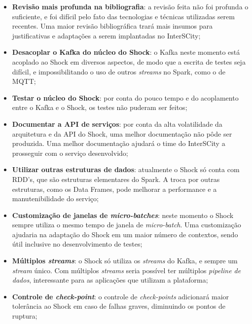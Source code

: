 \begin{itemize}
    \item \textbf{Revisão mais profunda na bibliografia}: a revisão feita não
        foi profunda o suficiente, e foi difícil pelo fato das tecnologias e
        técnicas utilizadas serem recentes. Uma maior revisão bibliográfica
        trará mais insumos para justificativas e adaptações a serem
        implantadas no InterSCity;

    \item \textbf{Desacoplar o Kafka do núcleo do Shock}: o Kafka neste
        momento está acoplado ao Shock em diversos aspectos, de modo que a
        escrita de testes seja difícil, e impossibilitando o uso de outros
        \textit{streams} no Spark, como o de MQTT;

    \item \textbf{Testar o núcleo do Shock}: por conta do pouco tempo e do
        acoplamento entre o Kafka e o Shock, os testes não puderam ser feitos;

    \item \textbf{Documentar a API de serviços}: por conta da alta volatilidade
        da arquitetura e da API do Shock, uma melhor documentação não pôde ser
        produzida. Uma melhor documentação ajudará o time do InterSCity a
        prosseguir com o serviço desenvolvido;

    \item \textbf{Utilizar outras estruturas de dados}: atualmente o Shock só
        conta com RDD's, que são estruturas elementares do Spark. A troca por
        outras estruturas, como os Data Frames, pode melhorar a performance e a
        manutenibilidade do serviço;

    \item \textbf{Customização de janelas de \textit{micro-batches}}: neste
        momento o Shock sempre utiliza o mesmo tempo de janela de
        \textit{micro-batch}. Uma customização ajudaria na adaptação do Shock
        em um maior número de contextos, sendo útil inclusive no
        desenvolvimento de testes;

    \item \textbf{Múltiplos \textit{streams}}: o Shock só utiliza os
        \textit{streams} do Kafka, e sempre um \textit{stream} único. Com
        múltiplos \textit{streams} seria possível ter múltiplos \textit{
        pipeline de dados}, interessante para as aplicações que utilizam
        a plataforma;

    \item \textbf{Controle de \textit{check-point}}: o controle de
        \textit{check-points} adicionará maior tolerância ao Shock em caso
        de falhas graves, diminuindo os pontos de ruptura;


\end{itemize}
